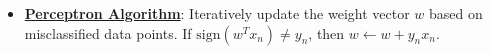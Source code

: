 \documentclass{article}%
\begin{document}
\begin{itemize}[leftmargin=*]%
\item \href{https://purdue.brightspace.com/d2l/common/assets/pdfjs-d2l-dist/1.0.14-legacy/web/viewer.html?file=%2Fcontent%2Fenforced%2F1095467-wl.202510.CS.24300.001%2F05L2-ML Basics.pdf%3Fou%3D1095467&lang=en-us&container=d2l-fileviewer-rendered-pdf&fullscreen=d2l-fileviewer-rendered-pdf-dialog&height=667#page=30}{\textbf{Perceptron Algorithm}}: Iteratively update the weight vector $w$ based on misclassified data points. If $\text{sign}(w^Tx_n) \ne y_n$, then $w \leftarrow w + y_nx_n$.%
\end{itemize}

%
\end{document}
